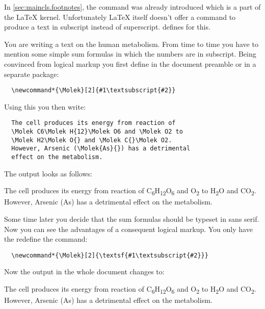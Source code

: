 \begin{Declaration}
\end{Declaration}
%
In \autoref{sec:maincls.footnotes},
 the command
 was already
introduced which is a part of the \LaTeX{} kernel. Unfortunately
\LaTeX{} itself doesn't offer a command to produce a text in
subscript instead of
superscript. \KOMAScript{}
defines  for this.
%
\begin{Example}
  You are writing a text on the human metabolism. From time to time
  you have to mention some simple sum formulas in which the
  numbers are in subscript. Being convinced from logical markup you
  first define in the document preamble or in a separate package:
\begin{lstlisting}
  \newcommand*{\Molek}[2]{#1\textsubscript{#2}}
\end{lstlisting}
  \newcommand*{\Molek}[2]{#1\textsubscript{#2}}
  Using this you then write:
\begin{lstlisting}
  The cell produces its energy from reaction of
  \Molek C6\Molek H{12}\Molek O6 and \Molek O2 to
  \Molek H2\Molek O{} and \Molek C{}\Molek O2.
  However, Arsenic (\Molek{As}{}) has a detrimental
  effect on the metabolism.
\end{lstlisting}
  The output looks as follows:
  \begin{ShowOutput}
  The cell produces its energy from reaction of \Molek C6\Molek
  H{12}\Molek O6 and \Molek O2 to \Molek H2\Molek O{} and \Molek
  C{}\Molek O2.  However, Arsenic (\Molek{As}{}) has a detrimental
  effect on the metabolism.
  \end{ShowOutput}
  Some time later you decide that the sum formulas should be
  typeset in sans serif. Now you can see the advantages of a
  consequent logical markup. You only have the redefine the
   command:
\begin{lstlisting}
  \newcommand*{\Molek}[2]{\textsf{#1\textsubscript{#2}}}
\end{lstlisting}
  \renewcommand*{\Molek}[2]{\textsf{#1\textsubscript{#2}}}
  Now the output in the whole document changes to:
  \begin{ShowOutput}
  The cell produces its energy from reaction of \Molek C6\Molek
  H{12}\Molek O6 and \Molek O2 to \Molek H2\Molek O{} and \Molek
  C{}\Molek O2.  However, Arsenic (\Molek{As}{}) has a detrimental
  effect on the metabolism.
  \end{ShowOutput}
\end{Example}
